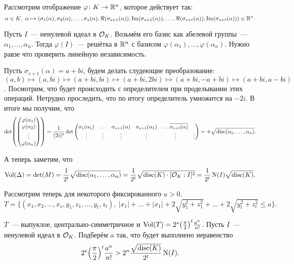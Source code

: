 	Рассмотрим отображение $\varphi\colon K \to \mathbb{R}^n$, которое действует так:
	\[
		\alpha \in K, \ \alpha \mapsto (\sigma_1(\alpha), \sigma_2(\alpha), \ldots, \sigma_s(\alpha), \Re(\sigma_{s + 1}(\alpha)), \mathop{\mathrm{Im}}\nolimits(\sigma_{s + 1}(\alpha)),  \ldots, \Re(\sigma_{s + t}(\alpha)), \mathop{\mathrm{Im}}\nolimits(\sigma_{s + t}(\alpha))) \in \mathbb{R}^n.
	\]

	Пусть $I$~--- ненулевой идеал в $\mathcal{O}_{K}$. Возьмём его базис как абелевой группы~--- $\alpha_1, \ldots, \alpha_n$. Тогда $\varphi(I)$~--- решётка в $\mathbb{R}^n$ с базисом $\varphi(\alpha_1), \ldots, \varphi(\alpha_n)$. Нужно равзе что проверить линейную независимость. 

	Пусть $\sigma_{s + 1}(\alpha) = a + bi$, будем делать слудеющие преобразование: $(a, b) \mapsto (a, bi) \mapsto (a + bi, bi) \mapsto (a + bi, 2bi) \mapsto (a + bi, -a + bi) \mapsto (a + bi, a - bi)$. Посмотрим, что будет происходить с определителем при проделывании этих операций. Нетрудно проследить, что по итогу определитель умножится на $-2i$. В итоге мы получим, что 
	\[
		\det\lr*{\begin{pmatrix} \varphi(\alpha_1) \\ \varphi(\alpha_2) \\ \vdots \\ \varphi(\alpha_n) \end{pmatrix}} = \frac{1}{(2i)^t} \det{\begin{pmatrix} \sigma_{1}(\alpha_1) & \ldots& \sigma_{s + 1}(\alpha) & \sigma_{s + 1}(\alpha_1) & \ldots \overline{\sigma_{s + t}(\alpha)} \\ \vdots & \vdots & \vdots & \vdots & \vdots & \vdots\end{pmatrix}} = \pm \sqrt{\disc(\alpha_1, \ldots, \alpha_n)}.
	\]

	А теперь заметим, что 
	\[
		\operatorname{Vol}(\Delta) = \det(M)
 = \frac{1}{2^t} \sqrt{\operatorname{disc}(\alpha_1, \ldots, \alpha_n)} = \frac{1}{2^t} \sqrt{\operatorname{disc}(K) \cdot [\mathcal{O}_{K} : I]^2} = \frac{1}{2^t} \operatorname{\mathrm{N}}(I) \sqrt{\operatorname{disc}(K)}.	\]

 	Рассмотрим теперь для некоторого фиксированного $a > 0$.
 	\[
 		T = \{ (x_1, x_2, \ldots, x_{s}, y_{1}, z_{1}, \ldots, y_{t}, z_{t}), \ |x_1| + \ldots + |x_1| + 2\sqrt{y_1^2 + z_1^2} + \ldots + 2\sqrt{y_t^2 + z_t^2} \le a \}. 
 	\]

 	$T$~--- выпуклое, центрально-симметричное и $\Vol(T) = 2^s \lr*{\frac{\pi}{2}}^t \frac{a^n}{n!}$.
 	Пусть $I$~--- ненулевой идеал в $\mathcal{O}_{K}$. Подберём $a$ так, что будет выполнено неравенство 
 	\begin{equation}
 		2^s \lr*{\frac{\pi}{2}}^t \frac{a^n}{n!} > 2^n \frac{\sqrt{\disc(K)}}{2^t} \Nm(I). \label{calculating_a}
 	\end{equation}

